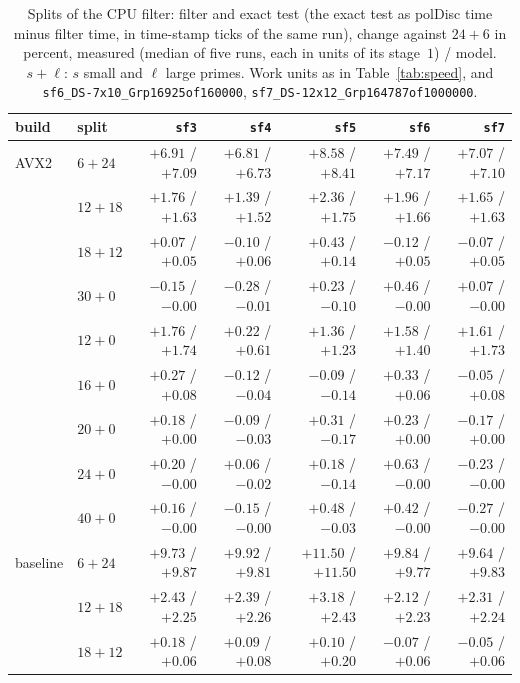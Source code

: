 \documentclass[10pt,a4paper]{article}
\newcommand{\code}[1]{\texttt{#1}}
\theoremstyle{plain}
\theoremstyle{definition}
\begin{document}
\begin{table}[ht]
\centering\footnotesize\setlength{\tabcolsep}{4pt}
\caption{Splits of the CPU filter: filter and exact test (the exact test as polDisc time minus filter time, in time-stamp ticks of the same run), change against
$24+6$ in percent, measured (median of five runs, each in units of its stage~$1$) / model.  $s+\ell$: $s$ small and $\ell$ large primes.  Work units as in
Table~\ref{tab:speed}, and \code{sf6\_DS-7x10\_Grp16925of160000}, \code{sf7\_DS-12x12\_Grp164787of1000000}.}\label{tab:split}
\begin{tabular}{@{}llrrrrr@{}}
\toprule
build & split & \code{sf3} & \code{sf4} & \code{sf5} & \code{sf6} & \code{sf7} \\ \midrule
AVX2 & $6+24$  & $+6.91$ / $+7.09$ & $+6.81$ / $+6.73$ & $+8.58$ / $+8.41$ & $+7.49$ / $+7.17$ & $+7.07$ / $+7.10$ \\
     & $12+18$ & $+1.76$ / $+1.63$ & $+1.39$ / $+1.52$ & $+2.36$ / $+1.75$ & $+1.96$ / $+1.66$ & $+1.65$ / $+1.63$ \\
     & $18+12$ & $+0.07$ / $+0.05$ & $-0.10$ / $+0.06$ & $+0.43$ / $+0.14$ & $-0.12$ / $+0.05$ & $-0.07$ / $+0.05$ \\
     & $30+0$  & $-0.15$ / $-0.00$ & $-0.28$ / $-0.01$ & $+0.23$ / $-0.10$ & $+0.46$ / $-0.00$ & $+0.07$ / $-0.00$ \\
     & $12+0$  & $+1.76$ / $+1.74$ & $+0.22$ / $+0.61$ & $+1.36$ / $+1.23$ & $+1.58$ / $+1.40$ & $+1.61$ / $+1.73$ \\
     & $16+0$  & $+0.27$ / $+0.08$ & $-0.12$ / $-0.04$ & $-0.09$ / $-0.14$ & $+0.33$ / $+0.06$ & $-0.05$ / $+0.08$ \\
     & $20+0$  & $+0.18$ / $+0.00$ & $-0.09$ / $-0.03$ & $+0.31$ / $-0.17$ & $+0.23$ / $+0.00$ & $-0.17$ / $+0.00$ \\
     & $24+0$  & $+0.20$ / $-0.00$ & $+0.06$ / $-0.02$ & $+0.18$ / $-0.14$ & $+0.63$ / $-0.00$ & $-0.23$ / $-0.00$ \\
     & $40+0$  & $+0.16$ / $-0.00$ & $-0.15$ / $-0.00$ & $+0.48$ / $-0.03$ & $+0.42$ / $-0.00$ & $-0.27$ / $-0.00$ \\ \midrule
baseline & $6+24$  & $+9.73$ / $+9.87$ & $+9.92$ / $+9.81$ & $+11.50$ / $+11.50$ & $+9.84$ / $+9.77$ & $+9.64$ / $+9.83$ \\
     & $12+18$ & $+2.43$ / $+2.25$ & $+2.39$ / $+2.26$ & $+3.18$ / $+2.43$ & $+2.12$ / $+2.23$ & $+2.31$ / $+2.24$ \\
     & $18+12$ & $+0.18$ / $+0.06$ & $+0.09$ / $+0.08$ & $+0.10$ / $+0.20$ & $-0.07$ / $+0.06$ & $-0.05$ / $+0.06$ \\

\end{tabular}
\end{table}
\end{document}
